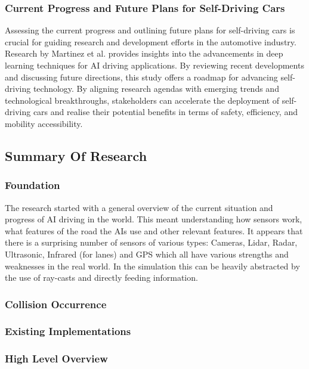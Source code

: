 \documentclass{article}
\begin{document}
\subsubsection{Current Progress and Future Plans for Self-Driving Cars}
Assessing the current progress and outlining future plans for self-driving cars is crucial for guiding research and development efforts in the automotive industry. Research by Martinez et al. \cite{Deep-learning-for-AI-driving} provides insights into the advancements in deep learning techniques for AI driving applications. By reviewing recent developments and discussing future directions, this study offers a roadmap for advancing self-driving technology. By aligning research agendas with emerging trends and technological breakthroughs, stakeholders can accelerate the deployment of self-driving cars and realise their potential benefits in terms of safety, efficiency, and mobility accessibility.

\subsection{Summary Of Research}
\subsubsection{Foundation}
The research started with a general overview of the current situation and progress of AI driving in the world. This meant understanding how sensors work, what features of the road the AIs use and other relevant features. It appears that there is a surprising number of sensors of various types: Cameras, Lidar, Radar, Ultrasonic, Infrared (for lanes) and GPS \cite{General-overview-of-ai-driving} which all have various strengths and weaknesses in the real world. In the simulation this can be heavily abstracted by the use of ray-casts and directly feeding information.

\subsubsection{Collision Occurrence}
\lipsum[2][1]

\subsubsection{Existing Implementations}
\lipsum[2][1]

\subsubsection{High Level Overview}
\lipsum[2][1]
\end{document}
